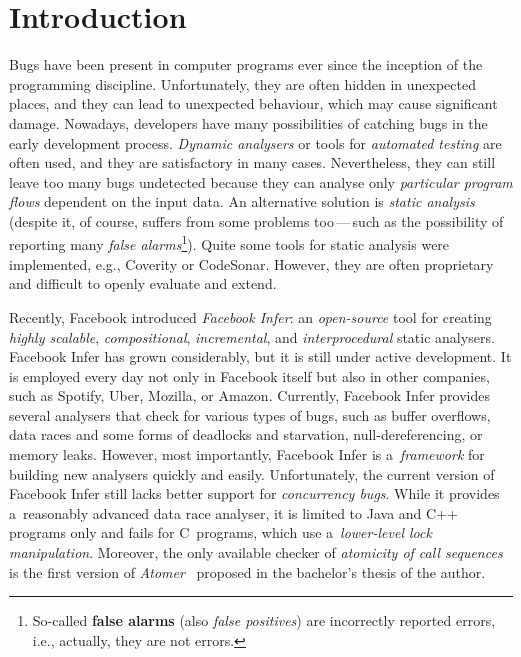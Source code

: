\documentclass{ExcelAtFIT}
\affiliation{%
    *\href{mailto:xharmi00@stud.fit.vutbr.cz}{xharmi00@stud.fit.vutbr.cz},
    \textit{Faculty of Information Technology, Brno University of Technology}%
}
\theoremstyle{example}
\begin{document}
\setlength{\abovedisplayskip}{.3em}
\setlength{\belowdisplayskip}{.3em}

\addtolength{\skip\footins}{-.3em}


\startdocument




\section{Introduction}

Bugs have been present in computer programs ever since the inception of the programming discipline. Unfortunately, they are often hidden in unexpected places, and they can lead to unexpected behaviour, which may cause significant damage. Nowadays, developers have many possibilities of catching bugs in the early development process. \emph{Dynamic analysers} or tools for \emph{automated testing} are often used, and they are satisfactory in many cases. Nevertheless, they can still leave too many bugs undetected because they can analyse only \emph{particular program flows} dependent on the input data. An alternative solution is \emph{static analysis} (despite it, of course, suffers from some problems too\,---\,such as the possibility of reporting many \emph{false alarms}\footnote{So-called \textbf{false alarms} (also \emph{false positives}) are incorrectly reported errors, i.e., actually, they are not errors.}). Quite some tools for static analysis were implemented, e.g., Coverity or CodeSonar. However, they are often proprietary and difficult to openly evaluate and extend.

Recently, Facebook introduced \emph{Facebook Infer}: an \emph{open-source} tool for creating \emph{highly scalable}, \emph{compositional}, \emph{incremental}, and \emph{interprocedural} static analysers. Facebook Infer has grown considerably, but it is still under active development. It is employed every day not only in Facebook itself but also in other companies, such as Spotify, Uber, Mozilla, or Amazon. Currently, Facebook Infer provides several analysers that check for various types of bugs, such as buffer overflows, data races and some forms of deadlocks and starvation, null-dereferencing, or memory leaks. However, most importantly, Facebook Infer is a~\emph{framework} for building new analysers quickly and easily. Unfortunately, the current version of Facebook Infer still lacks better support for \emph{concurrency bugs}. While it provides a~reasonably advanced data race analyser, it is limited to Java and C++ programs only and fails for C~programs, which use a~\emph{lower-level lock manipulation}. Moreover, the only available checker of \emph{atomicity of call sequences} is the first version of \emph{Atomer}~\cite{harmimBP} proposed in the bachelor's thesis of the author.
\end{document}
